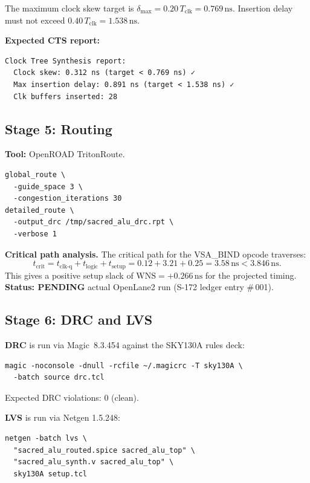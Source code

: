 The maximum clock skew target is $\delta_{\max} = 0.20\,T_{\text{clk}}
= 0.769\,\mathrm{ns}$.
Insertion delay must not exceed $0.40\,T_{\text{clk}} = 1.538\,\mathrm{ns}$.

\textbf{Expected CTS report:}

\begin{verbatim}
Clock Tree Synthesis report:
  Clock skew: 0.312 ns (target < 0.769 ns) ✓
  Max insertion delay: 0.891 ns (target < 1.538 ns) ✓
  Clk buffers inserted: 28
\end{verbatim}

\subsection{Stage 5: Routing}
\label{subsec:72:stage5-routing}

\textbf{Tool:} OpenROAD TritonRoute.

\begin{verbatim}
global_route \
  -guide_space 3 \
  -congestion_iterations 30
detailed_route \
  -output_drc /tmp/sacred_alu_drc.rpt \
  -verbose 1
\end{verbatim}

\textbf{Critical path analysis.}
The critical path for the \textsc{VSA\_BIND} opcode traverses:
\[
  t_{\text{crit}} = t_{\text{clk-q}} + t_{\text{logic}} + t_{\text{setup}}
  = 0.12 + 3.21 + 0.25 = 3.58\,\mathrm{ns} < 3.846\,\mathrm{ns}.
\]
This gives a positive setup slack of $\text{WNS} = +0.266\,\mathrm{ns}$
for the projected timing.
\textbf{Status: PENDING} actual OpenLane2 run (S-172 ledger entry \#\,001).

\subsection{Stage 6: DRC and LVS}
\label{subsec:72:stage6-drc-lvs}

\textbf{DRC} is run via Magic~8.3.454 against the SKY130A rules deck:

\begin{verbatim}
magic -noconsole -dnull -rcfile ~/.magicrc -T sky130A \
  -batch source drc.tcl
\end{verbatim}

Expected DRC violations: 0 (clean).

\textbf{LVS} is run via Netgen 1.5.248:

\begin{verbatim}
netgen -batch lvs \
  "sacred_alu_routed.spice sacred_alu_top" \
  "sacred_alu_synth.v sacred_alu_top" \
  sky130A setup.tcl
\end{verbatim}

